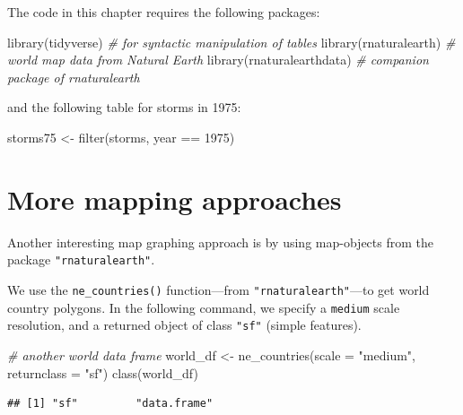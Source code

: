 \documentclass[
]{book}
\newenvironment{Shaded}{\begin{snugshade}}{\end{snugshade}}
\newcommand{\AttributeTok}[1]{\textcolor[rgb]{0.77,0.63,0.00}{#1}}
\newcommand{\CommentTok}[1]{\textcolor[rgb]{0.56,0.35,0.01}{\textit{#1}}}
\newcommand{\DecValTok}[1]{\textcolor[rgb]{0.00,0.00,0.81}{#1}}
\newcommand{\FunctionTok}[1]{\textcolor[rgb]{0.00,0.00,0.00}{#1}}
\newcommand{\NormalTok}[1]{#1}
\newcommand{\OtherTok}[1]{\textcolor[rgb]{0.56,0.35,0.01}{#1}}
\newcommand{\SpecialCharTok}[1]{\textcolor[rgb]{0.00,0.00,0.00}{#1}}
\newcommand{\StringTok}[1]{\textcolor[rgb]{0.31,0.60,0.02}{#1}}
\begin{document}
The code in this chapter requires the following packages:

\begin{Shaded}
\begin{Highlighting}[]
\FunctionTok{library}\NormalTok{(tidyverse)          }\CommentTok{\# for syntactic manipulation of tables}
\FunctionTok{library}\NormalTok{(rnaturalearth)      }\CommentTok{\# world map data from Natural Earth}
\FunctionTok{library}\NormalTok{(rnaturalearthdata)  }\CommentTok{\# companion package of rnaturalearth}
\end{Highlighting}
\end{Shaded}

and the following table for storms in 1975:

\begin{Shaded}
\begin{Highlighting}[]
\NormalTok{storms75 }\OtherTok{\textless{}{-}} \FunctionTok{filter}\NormalTok{(storms, year }\SpecialCharTok{==} \DecValTok{1975}\NormalTok{)}
\end{Highlighting}
\end{Shaded}

\hypertarget{more-mapping-approaches}{%
\section{More mapping approaches}\label{more-mapping-approaches}}

Another interesting map graphing approach is by using map-objects from the
package \texttt{"rnaturalearth"}.

We use the \texttt{ne\_countries()} function---from \texttt{"rnaturalearth"}---to get world
country polygons. In the following command, we specify a \texttt{medium} scale
resolution, and a returned object of class \texttt{"sf"} (simple features).

\begin{Shaded}
\begin{Highlighting}[]
\CommentTok{\# another world data frame}
\NormalTok{world\_df }\OtherTok{\textless{}{-}} \FunctionTok{ne\_countries}\NormalTok{(}\AttributeTok{scale =} \StringTok{"medium"}\NormalTok{, }\AttributeTok{returnclass =} \StringTok{"sf"}\NormalTok{)}
\FunctionTok{class}\NormalTok{(world\_df)}
\end{Highlighting}
\end{Shaded}

\begin{verbatim}
## [1] "sf"         "data.frame"
\end{verbatim}
\end{document}
